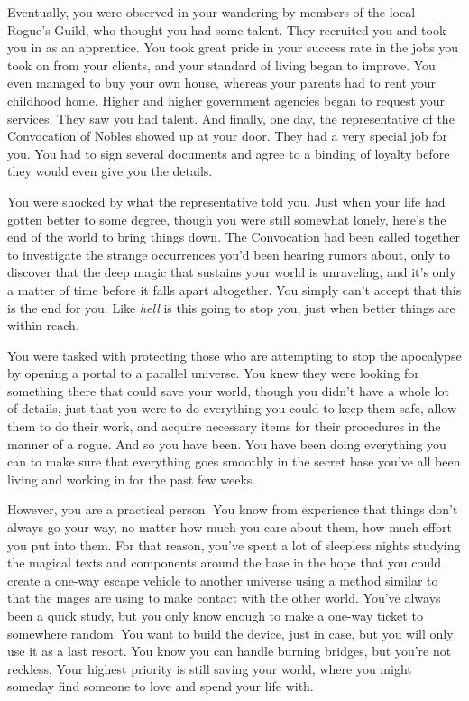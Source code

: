 \documentclass[char]{guildcamp3}
\begin{document}
Eventually, you were observed in your wandering by members of the local Rogue's Guild, who thought you had some talent. They recruited you and took you in as an apprentice. You took great pride in your success rate in the jobs you took on from your clients, and your standard of living began to improve. You even managed to buy your own house, whereas your parents had to rent your childhood home. Higher and higher government agencies began to request your services. They saw you had talent. And finally, one day, the representative of the Convocation of Nobles showed up at your door. They had a very special job for you. You had to sign several documents and agree to a binding of loyalty before they would even give you the details.

You were shocked by what the representative told you. Just when your life had gotten better to some degree, though you were still somewhat lonely, here's the end of the world to bring things down. The Convocation had been called together to investigate the strange occurrences you'd been hearing rumors about, only to discover that the deep magic that sustains your world is unraveling, and it's only a matter of time before it falls apart altogether. You simply can't accept that this is the end for you. Like \emph{hell} is this going to stop you, just when better things are within reach. 

You were tasked with protecting those who are attempting to stop the apocalypse by opening a portal to a parallel universe. You knew they were looking for something there that could save your world, though you didn't have a whole lot of details, just that you were to do everything you could to keep them safe, allow them to do their work, and acquire necessary items for their procedures in the manner of a rogue. And so you have been. You have been doing everything you can to make sure that everything goes smoothly in the secret base you've all been living and working in for the past few weeks.

However, you are a practical person. You know from experience that things don't always go your way, no matter how much you care about them, how much effort you put into them. For that reason, you've spent a lot of sleepless nights studying the magical texts and components around the base in the hope that you could create a one-way escape vehicle to another universe using a method similar to that the mages are using to make contact with the other world. You've always been a quick study, but you only know enough to make a one-way ticket to somewhere random. You want to build the device, just in case, but you will only use it as a last resort. You know you can handle burning bridges, but you're not reckless, Your highest priority is still saving your world, where you might someday find someone to love and spend your life with.
\end{document}
